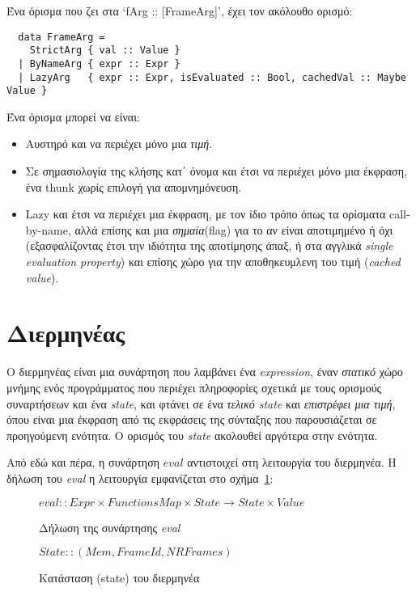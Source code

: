 \documentclass[diploma]{softlab-thesis}
\begin{document}
Ένα όρισμα που ζει στα `fArg :: [FrameArg]', έχει τον ακόλουθο ορισμό:
\begin{verbatim}
  data FrameArg = 
    StrictArg { val :: Value }
  | ByNameArg { expr :: Expr }
  | LazyArg   { expr :: Expr, isEvaluated :: Bool, cachedVal :: Maybe Value }  
\end{verbatim}

Ένα όρισμα μπορεί να είναι:
\begin{itemize}
  \item Αυστηρό και να περιέχει μόνο μια \textit{τιμή}.
  \item Σε σημασιολογία της κλήσης κατ΄ όνομα και έτσι να περιέχει μόνο μια έκφραση, ένα thunk χωρίς επιλογή για
  απομνημόνευση.
  \item Lazy και έτσι να περιέχει μια έκφραση, με τον ίδιο τρόπο όπως τα ορίσματα call-by-name, 
  αλλά επίσης και μια \textit{σημαία}(flag) για το αν είναι αποτιμημένο ή όχι (εξασφαλίζοντας έτσι την ιδιότητα της αποτίμησης άπαξ, ή στα αγγλικά \textit{single evaluation property}) 
  και επίσης χώρο για την αποθηκευμλενη του τιμή (\textit{cached value}).
\end{itemize}

\section{Διερμηνέας}

Ο διερμηνέας είναι μια συνάρτηση που λαμβάνει ένα \textit{expression}, έναν \textit{στατικό} χώρο μνήμης ενός προγράμματος που περιέχει
πληροφορίες σχετικά με τους ορισμούς συναρτήσεων και ένα \textit{state}, και 
φτάνει σε ένα \textit{τελικό state} και \textit{επιστρέφει μια τιμή}, όπου είναι μια έκφραση από τις εκφράσεις της σύνταξης
που παρουσιάζεται σε προηγούμενη ενότητα. Ο ορισμός του \textit{state} ακολουθεί αργότερα στην ενότητα.

Από εδώ και πέρα, η συνάρτηση $\mathit{eval}$ αντιστοιχεί στη λειτουργία του διερμηνέα. Η δήλωση του \textit{eval}
η λειτουργία εμφανίζεται στο σχήμα~\ref{fig:evalEL}:
\begin{figure}[h]
  $
    \mathit{eval} :: \mathit{Expr} \times \mathit{FunctionsMap} \times \mathit{State} \rightarrow 
    \mathit{State} \times \mathit{Value}
  $
\caption{Δήλωση της συνάρτησης \textit{eval}\label{fig:evalEL}}
\end{figure}

\begin{figure}[t]
$
  \mathit{State :: (Mem, FrameId, NRFrames)}
$
\caption{Κατάσταση (state) του διερμηνέα\label{fig:stateEL}}
\end{figure} 
\end{document}
